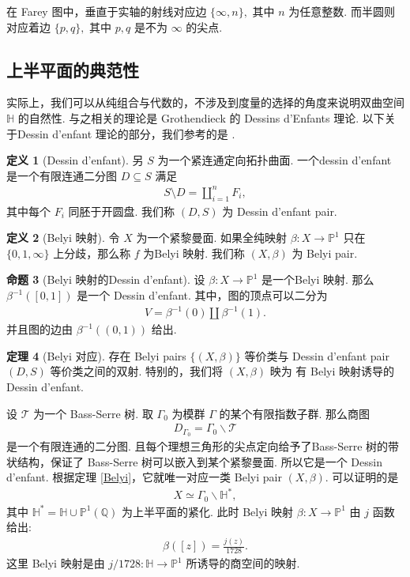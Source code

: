 \documentclass[10pt,UTF8]{ctexart}
\renewcommand{\P}{\mathbb{P}}
\newcommand{\Q}{\mathbb{Q}}
\newcommand{\HH}{\mathbb{H}} %
\theoremstyle{definition}
\newtheorem{theorem}{定理}[section]
\newtheorem{proposition}[theorem]{命题}
\newtheorem{definition}[theorem]{定义}
\theoremstyle{remark}
\begin{document}
在 Farey 图中，垂直于实轴的射线对应边 $\{\infty,n\}, $ 其中 $n$ 为任意整数. 而半圆则对应着边 $\{p,q\}, $ 其中 $p,q$ 是不为 $\infty$ 的尖点. 

\subsection{上半平面的典范性}
实际上，我们可以从纯组合与代数的，不涉及到度量的选择的角度来说明双曲空间 $\HH$ 的自然性. 与之相关的理论是 Grothendieck 的 Dessins d'Enfants 理论.
以下关于Dessin d'enfant 理论的部分，我们参考的是 \cite{GirondoGonzalezDiez2012}.

\begin{definition}[Dessin d'enfant]
另 $S$ 为一个紧连通定向拓扑曲面. 一个dessin d'enfant 是一个有限连通二分图 $D\subseteq S$ 满足 
\begin{align*}
    S\setminus D = \coprod_{i=1}^n F_i, 
\end{align*}
其中每个 $F_i$ 同胚于开圆盘. 我们称 $(D,S)$ 为 Dessin d'enfant pair.
\end{definition}

\begin{definition}[Belyi 映射]
    令 $X$ 为一个紧黎曼面. 如果全纯映射 $\beta:X\to \P^1$ 只在 $\{0,1,\infty\}$ 上分歧，那么称 $f$ 为Belyi 映射. 
    我们称 $(X,\beta)$ 为 Belyi pair.
\end{definition}

\begin{proposition}[Belyi 映射的Dessin d'enfant]
    设 $\beta:X\to \P^1$ 是一个Belyi 映射. 那么 $\beta^{-1}([0,1])$ 是一个 Dessin d'enfant. 
    其中，图的顶点可以二分为 
    \begin{align*}
        V = \beta^{-1}(0)\coprod \beta^{-1}(1).
    \end{align*}
    并且图的边由 $\beta^{-1}((0, 1))$ 给出. 
\end{proposition}



\begin{theorem}[Belyi 对应]{\label{Belyi}}
存在 Belyi pairs $\{(X,\beta)\}$ 等价类与 Dessin d'enfant pair $(D,S)$ 等价类之间的双射.
特别的，我们将 $(X,\beta)$ 映为 有 Belyi 映射诱导的 Dessin d'enfant. 
\end{theorem}


设 $\mathcal{T}$ 为一个 Bass-Serre 树. 取 $\Gamma_0$ 为模群 $\Gamma$ 的某个有限指数子群. 那么商图
\begin{align*}
    D_{\Gamma_0} = \Gamma_0 \backslash \mathcal{T}
\end{align*}
是一个有限连通的二分图. 且每个理想三角形的尖点定向给予了Bass-Serre 树的带状结构，保证了 Bass-Serre 树可以嵌入到某个紧黎曼面.
 所以它是一个 Dessin d'enfant. 
根据定理 \ref{Belyi}，它就唯一对应一类 Belyi pair $(X,\beta)$. 可以证明的是 
\begin{align*}
    X \simeq \Gamma_0 \backslash \HH^*, 
\end{align*}
其中 $\HH^*= \HH\cup \P^1(\Q)$ 为上半平面的紧化. 此时 Belyi 映射 $\beta:X\to \P^1$ 由 $j$ 函数给出: 
\begin{align*}
    \beta([z]) = \frac{j(z)}{1728}.
\end{align*}
这里 Belyi 映射是由 $j/1728:\HH \to \P^1$ 所诱导的商空间的映射. 
\end{document}
